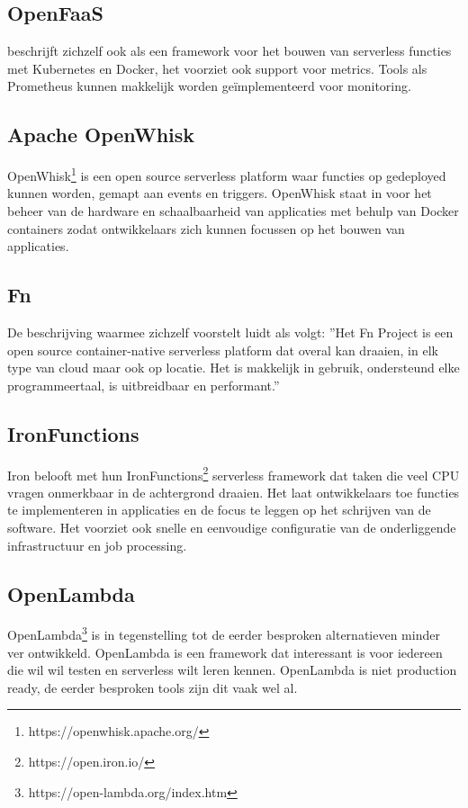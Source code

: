 \subsection{OpenFaaS}
\textcite{OpenFaaS2019} beschrijft zichzelf ook als een framework voor het bouwen van serverless functies met Kubernetes en Docker, het voorziet ook support voor metrics. Tools als Prometheus kunnen makkelijk worden geïmplementeerd voor monitoring.

\subsection{Apache OpenWhisk}
OpenWhisk\footnote{https://openwhisk.apache.org/} is een open source serverless platform waar functies op gedeployed kunnen worden, gemapt aan events en triggers. OpenWhisk staat in voor het beheer van de hardware en schaalbaarheid van applicaties met behulp van Docker containers zodat ontwikkelaars zich kunnen focussen op het bouwen van applicaties.

\subsection{Fn}
De beschrijving waarmee \textcite{FnProject2019} zichzelf voorstelt luidt als volgt: ''Het Fn Project is een open source container-native serverless platform dat overal kan draaien, in elk type van cloud maar ook op locatie. Het is makkelijk in gebruik, ondersteund elke programmeertaal, is uitbreidbaar en performant.''

\subsection{IronFunctions}
Iron belooft met hun IronFunctions\footnote{https://open.iron.io/} serverless framework dat taken die veel CPU vragen onmerkbaar in de achtergrond draaien. Het laat ontwikkelaars toe functies te implementeren in applicaties en de focus te leggen op het schrijven van de software. Het voorziet ook snelle en eenvoudige configuratie van de onderliggende infrastructuur en job processing.

\subsection{OpenLambda}
OpenLambda\footnote{https://open-lambda.org/index.htm} is in tegenstelling tot de eerder besproken alternatieven minder ver ontwikkeld. OpenLambda is een framework dat interessant is voor iedereen die wil wil testen en serverless wilt leren kennen. OpenLambda is niet production ready, de eerder besproken tools zijn dit vaak wel al.

